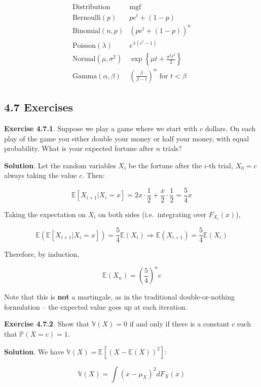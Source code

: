 \[
\begin{array}{ll}
\text{Distribution} & \text{mgf} \\
\hline
\text{Bernoulli}(p)   & pe^t + (1 - p)         \\
\text{Binomial}(n, p) & (pe^t + (1 - p))^{n}     \\
\text{Poisson}(\lambda) & e^{\lambda(e^t - 1)} \\
\text{Normal}(\mu, \sigma^{2}) & \exp\left\{\mu t + \frac{\sigma^{2} t^{2}}{2} \right\} \\
\text{Gamma}(\alpha, \beta) & \left( \frac{\beta}{\beta - t} \right)^\alpha \text{ for } t < \beta
\end{array}
\]

\subsection*{4.7 Exercises}

\textbf{Exercise 4.7.1}. Suppose we play a game where we start with
\(c\) dollars. On each play of the game you either double your money or
half your money, with equal probability. What is your expected fortune
after \(n\) trials?

\textbf{Solution}. Let the random variables \(X_{i}\) be the fortune after
the \(i\)-th trial, \(X_{0} = c\) always taking the value \(c\). Then:

\[ \mathbb{E}[X_{i + 1} | X_{i} = x] = 2x \cdot \frac{1}{2} + \frac{x}{2} \cdot \frac{1}{2} = \frac{5}{4}x \]

Taking the expectation on \(X_{i}\) on both sides (i.e.~integrating over
\(F_{X_{i}}(x)\)),

\[ \mathbb{E}(\mathbb{E}[X_{i + 1} | X_{i} = x]) = \frac{5}{4} \mathbb{E}(X_{i}) \Longrightarrow \mathbb{E}(X_{i+1}) = \frac{5}{4}  \mathbb{E}(X_{i})\]

Therefore, by induction,

\[ \mathbb{E}(X_{n}) = \left(\frac{5}{4}\right)^{n} c \]

Note that this is \textbf{not} a martingale, as in the traditional
double-or-nothing formulation -- the expected value goes up at each
iteration.

\textbf{Exercise 4.7.2}. Show that \(\mathbb{V}(X) = 0\) if and only if
there is a constant \(c\) such that \(\mathbb{P}(X = c) = 1\).

\textbf{Solution}. We have
\(\mathbb{V}(X) = \mathbb{E}[(X - \mathbb{E}(X))^{2}]\):

\[ \mathbb{V}(X) = \int (x - \mu_X)^{2} dF_X(x) \]

